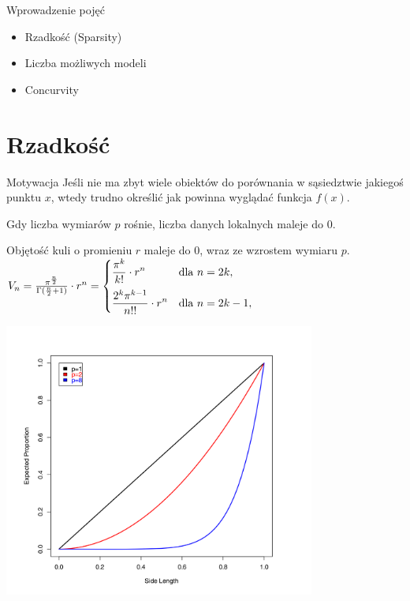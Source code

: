 \documentclass[a4paper]{beamer}
\begin{document}
\begin{frame}
\begin{block}{Wprowadzenie pojęć}
\begin{itemize}
\item Rzadkość (Sparsity)
\item Liczba możliwych modeli
\item Concurvity
\end{itemize}
\end{block}

\end{frame}

\section{Rzadkość}
\begin{frame}
\begin{block}{Motywacja}
Jeśli nie ma zbyt wiele obiektów do porównania w sąsiedztwie jakiegoś punktu $x$, wtedy trudno określić jak powinna wyglądać funkcja $f(x)$.
\end{block}
\begin{block}{}
Gdy liczba wymiarów $p$ rośnie, liczba danych lokalnych maleje do 0. 
\end{block}
\begin{block}{}
Objętość kuli o promieniu $r$ maleje do 0, wraz ze wzrostem wymiaru $p$. \\
$V_{n}=\frac { \pi^{\frac{n}{2}}}{\Gamma (\frac{n}{2}+1)}\cdot r^{n} = \begin{cases} \displaystyle {\pi^k\over k!}\cdot r^n & \mbox{dla }n=2k, \\[2ex] \displaystyle {2^k \pi^{k-1}\over n!!}\cdot r^n & \mbox{dla } n=2k-1, \end{cases}$
\end{block}
\end{frame}

\begin{frame}

\begin{center}
\includegraphics[height=9cm]{ball.png}
\end{center}
\end{frame}
\end{document}
